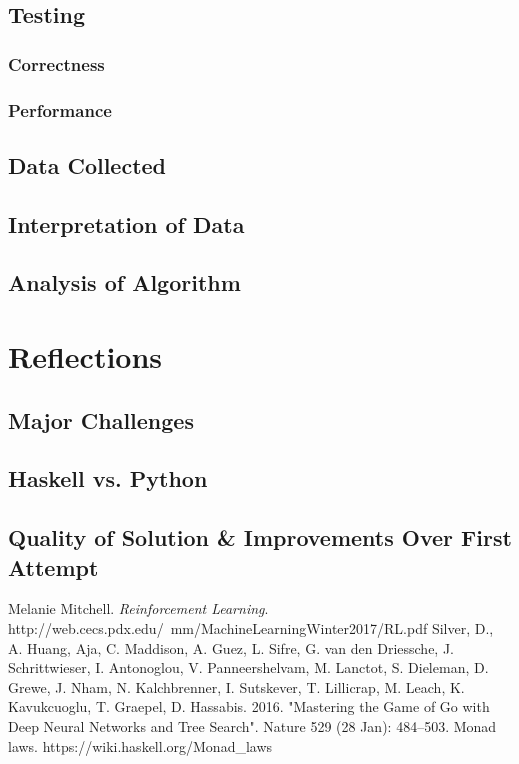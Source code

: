 \documentclass[12pt,a4paper]{article}
\begin{document}
		\subsection{Testing}
		
			\subsubsection{Correctness}
			
			\subsubsection{Performance}
		
		\subsection{Data Collected}
		
		\subsection{Interpretation of Data}
		
		\subsection{Analysis of Algorithm}
	
	\section{Reflections}
	
		\subsection{Major Challenges}
		
		\subsection{Haskell vs. Python}
		
		\subsection{Quality of Solution \& Improvements Over First Attempt}

	\pagebreak
	\begin{thebibliography}{9}
		Melanie  Mitchell.
		\textit{Reinforcement Learning}.
		http://web.cecs.pdx.edu/~mm/MachineLearningWinter2017/RL.pdf
		Silver, D., A. Huang, Aja, C. Maddison, A. Guez, L. Sifre, G. van den Driessche, J. Schrittwieser, I. Antonoglou, V. Panneershelvam, M. Lanctot, S. Dieleman, D. Grewe, J. Nham, N. Kalchbrenner, I. Sutskever, T. Lillicrap, M. Leach, K. Kavukcuoglu, T. Graepel, D. Hassabis. 2016. "Mastering the Game of Go with Deep Neural Networks and Tree Search". Nature 529 (28 Jan): 484--503.
		Monad laws.
		https://wiki.haskell.org/Monad\_laws
	\end{thebibliography}
	
	
            
            
\end{document}
